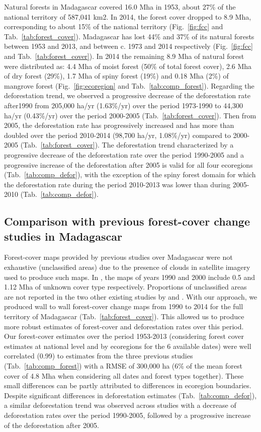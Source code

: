 \documentclass[a4paper, 12pt, leqno]{article} %
\begin{document}
Natural forests in Madagascar covered 16.0 Mha in 1953, about 27\% of
the national territory of 587,041 km2. In 2014, the forest cover
dropped to 8.9 Mha, corresponding to about 15\% of the national
territory (Fig.~\ref{fig:fcc} and
Tab.~\ref{tab:forest_cover}). Madagascar has lost 44\% and 37\% of its
natural forests between 1953 and 2013, and between c. 1973 and 2014
respectively (Fig.~\ref{fig:fcc} and Tab.~\ref{tab:forest_cover}). In
2014 the remaining 8.9 Mha of natural forest were distributed as: 4.4
Mha of moist forest (50\% of total forest cover), 2.6 Mha of dry
forest (29\%), 1.7 Mha of spiny forest (19\%) and 0.18 Mha (2\%) of
mangrove forest (Fig.~\ref{fig:ecoregion} and
Tab.~\ref{tab:comp_forest}). Regarding the deforestation trend, we
observed a progressive decrease of the deforestation rate after1990
from 205,000 ha/yr (1.63\%/yr) over the period 1973-1990 to 44,300
ha/yr (0.43\%/yr) over the period 2000-2005
(Tab.~\ref{tab:forest_cover}). Then from 2005, the deforestation rate
has progressively increased and has more than doubled over the period
2010-2014 (98,700 ha/yr, 1.08\%/yr) compared to 2000-2005
(Tab.~\ref{tab:forest_cover}). The deforestation trend characterized
by a progressive decrease of the deforestation rate over the period
1990-2005 and a progressive increase of the deforestation after 2005
is valid for all four ecoregions (Tab.~\ref{tab:comp_defor}), with the
exception of the spiny forest domain for which the deforestation rate
during the period 2010-2013 was lower than during 2005-2010
(Tab.~\ref{tab:comp_defor}).

\subsection{Comparison with previous forest-cover change studies
in Madagascar}

Forest-cover maps provided by previous studies over Madagascar were
not exhaustive (unclassified areas) due to the presence of clouds in
satellite imagery used to produce such maps. In \citet{Harper2007},
the maps of years 1990 and 2000 include 0.5 and 1.12 Mha of unknown
cover type respectively. Proportions of unclassified areas are not
reported in the two other existing studies by \citet{MEFT2009} and
\citet{ONE2015}.  With our approach, we produced wall to wall
forest-cover change maps from 1990 to 2014 for the full territory of
Madagascar (Tab.~\ref{tab:forest_cover}). This allowed us to produce
more robust estimates of forest-cover and deforestation rates over
this period. Our forest-cover estimates over the period 1953-2013
(considering forest cover estimates at national level and by
ecoregions for the 6 available dates) were well correlated (0.99) to
estimates from the three previous studies (Tab.~\ref{tab:comp_forest})
with a RMSE of 300,000 ha (6\% of the mean forest cover of 4.8 Mha
when considering all dates and forest types together). These small
differences can be partly attributed to differences in ecoregion
boundaries. Despite significant differences in deforestation estimates
(Tab.~\ref{tab:comp_defor}), a similar deforestation trend was
observed across studies with a decrease of deforestation rates over
the period 1990-2005, followed by a progressive increase of the
deforestation after 2005.
\end{document}
